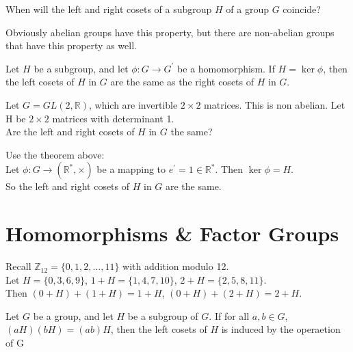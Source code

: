 
\begin{eg}
    When will the left and right cosets of a subgroup $H$ of a group $G$ coincide?
\end{eg}
\begin{answer}
Obviously abelian groups have this property, but there are non-abelian groups that have this property as well.\\
\end{answer}

\begin{theorem}
    Let $H$ be a subgroup, and let $\phi: G \to G^{\prime}$ be a homomorphism. 
    If $H = \ker \phi$, then the left cosets of $H$ in $G$ are the same as the right cosets of $H$ in $G$.
\end{theorem}

\begin{eg}
    Let $G = GL(2, \mathbb{R})$, which are invertible $2 \times 2$ matrices. This is non abelian. Let H be $2 \times 2$ matrices with determinant 1.\\
    Are the left and right cosets of $H$ in $G$ the same?\\
\end{eg}
\begin{answer}
    Use the theorem above:\\
    Let $\phi: G \to (\mathbb{R}^{\ast}, \times)$ be a mapping to $e^{\prime} = 1 \in \mathbb{R}^{\ast}$. Then $\ker \phi = H$.\\ 
    So the left and right cosets of $H$ in $G$ are the same.\\
\end{answer}

\section{Homomorphisms \& Factor Groups}

\begin{eg}
    Recall $\mathbb{Z}_{12} = \{0, 1, 2, \dots, 11\}$ with addition modulo 12.\\
    Let $H = \{0, 3, 6, 9\}$,  $1 + H = \{1, 4, 7, 10\}$, $2 + H = \{2, 5, 8, 11\}$.\\
    Then $(0+H) + (1+H) = 1 + H$, $(0+H) + (2+H) = 2 + H$.\\
\end{eg}

\begin{definition}
    Let $G$ be a group, and let $H$ be a subgroup of $G$. If for all $a, b \in G$, $(aH)(bH) = (ab)H$, then the left cosets of $H$ is induced by the operaetion of G
\end{definition}


